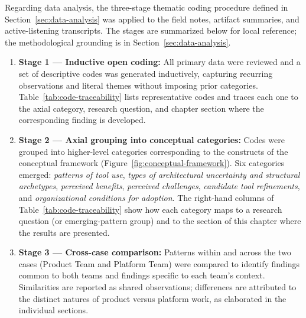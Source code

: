 Regarding data analysis, the three-stage thematic coding procedure defined in
Section~\ref{sec:data-analysis} was applied to the field
notes, artifact summaries, and active-listening transcripts. The stages are
summarized below for local reference; the methodological grounding is in
Section~\ref{sec:data-analysis}.
\begin{enumerate}
  \item \textbf{Stage 1 — Inductive open coding:} All primary data were
    reviewed and a set of descriptive codes was generated inductively,
    capturing recurring observations and literal themes without imposing
    prior categories. Table~\ref{tab:code-traceability} lists representative
    codes and traces each one to the axial category, research question, and
    chapter section where the corresponding finding is developed.
  \item \textbf{Stage 2 — Axial grouping into conceptual categories:} Codes
    were grouped into higher-level categories corresponding to the constructs
    of the conceptual framework (Figure~\ref{fig:conceptual-framework}).
    Six categories emerged: \emph{patterns of tool use}, \emph{types of
    architectural uncertainty and structural archetypes}, \emph{perceived
    benefits}, \emph{perceived challenges}, \emph{candidate tool refinements},
    and \emph{organizational conditions for adoption}. The right-hand columns
    of Table~\ref{tab:code-traceability} show how each category maps to a
    research question (or emerging-pattern group) and to the section of this
    chapter where the results are presented.
  \item \textbf{Stage 3 — Cross-case comparison:} Patterns within and across
    the two cases (Product Team and Platform Team) were compared to identify
    findings common to both teams and findings specific to each team's context.
    Similarities are reported as shared observations; differences are attributed
    to the distinct natures of product versus platform work, as elaborated in
    the individual sections.
\end{enumerate}

